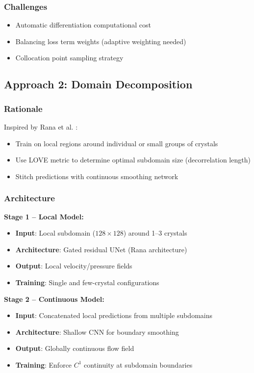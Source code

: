 \subsubsection{Challenges}
\begin{itemize}
    \item Automatic differentiation computational cost
    \item Balancing loss term weights (adaptive weighting needed)
    \item Collocation point sampling strategy
\end{itemize}

\subsection{Approach 2: Domain Decomposition}

\subsubsection{Rationale}
Inspired by Rana et al. \cite{rana2024}:
\begin{itemize}
    \item Train on local regions around individual or small groups of crystals
    \item Use LOVE metric to determine optimal subdomain size (decorrelation length)
    \item Stitch predictions with continuous smoothing network
\end{itemize}

\subsubsection{Architecture}
\textbf{Stage 1 -- Local Model:}
\begin{itemize}
    \item \textbf{Input}: Local subdomain ($128 \times 128$) around 1--3 crystals
    \item \textbf{Architecture}: Gated residual UNet (Rana architecture)
    \item \textbf{Output}: Local velocity/pressure fields
    \item \textbf{Training}: Single and few-crystal configurations
\end{itemize}

\textbf{Stage 2 -- Continuous Model:}
\begin{itemize}
    \item \textbf{Input}: Concatenated local predictions from multiple subdomains
    \item \textbf{Architecture}: Shallow CNN for boundary smoothing
    \item \textbf{Output}: Globally continuous flow field
    \item \textbf{Training}: Enforce $C^1$ continuity at subdomain boundaries
\end{itemize}

